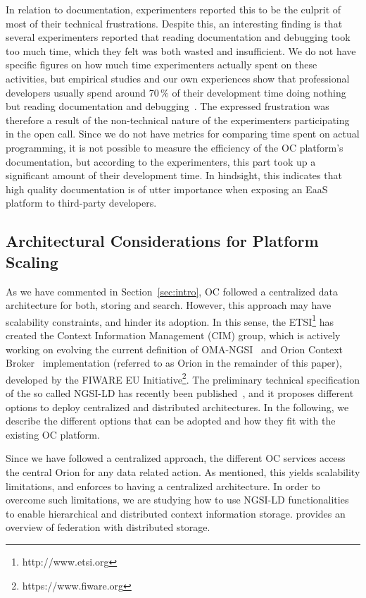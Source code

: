 In relation to documentation, experimenters reported this to be the culprit of most of their technical frustrations. Despite this, an interesting finding is that several experimenters reported that reading documentation and debugging took too much time, which they felt was both wasted and insufficient. We do not have specific figures on how much time experimenters actually spent on these activities, but empirical studies and our own experiences show that professional developers usually spend around 70\,$\%$ of their development time doing nothing but reading documentation and debugging~\cite{Minelli2015}. The expressed frustration was therefore a result of the non-technical nature of the experimenters participating in the open call. Since we do not have metrics for comparing time spent on actual programming, it is not possible to measure the efficiency of the OC platform's documentation, but according to the experimenters, this part took up a significant amount of their development time. In hindsight, this indicates that high quality documentation is of utter importance when exposing an EaaS platform to third-party developers.

\subsection{Architectural Considerations for Platform Scaling}

As we have commented in Section~\ref{sec:intro}, OC followed a centralized data architecture for both, storing and search. However, this approach may have scalability constraints, and hinder its adoption. In this sense, the ETSI\footnote{http://www.etsi.org} has created the Context Information Management (CIM) group, which is actively working on evolving the current definition of OMA-NGSI~\cite{NGSIOMA} and Orion Context Broker~\cite{FiwareOrion}  implementation (referred to as Orion in the remainder of this paper), developed by the FIWARE EU Initiative\footnote{https://www.fiware.org}. The preliminary technical specification of the so called NGSI-LD has recently been published~\cite{NGSILD}, and it proposes different options to deploy centralized and distributed architectures. In the following, we describe the different options that can be adopted and how they fit with the existing OC platform. 

Since we have followed a centralized approach, the different OC services access the central Orion for any data related action. As mentioned, this yields scalability limitations, and enforces to having a centralized architecture. In order to overcome such limitations, we are studying how to use NGSI-LD functionalities to enable hierarchical and distributed context information storage.  provides an overview of federation with distributed storage.


